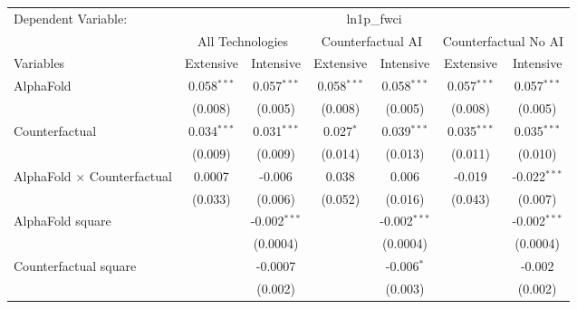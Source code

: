 \begingroup
\centering
\begin{tabular}{lcccccc}
   \tabularnewline \midrule \midrule
   Dependent Variable: & \multicolumn{6}{c}{ln1p\_fwci}\\
 & \multicolumn{2}{c}{All Technologies} & \multicolumn{2}{c}{Counterfactual AI} & \multicolumn{2}{c}{Counterfactual No AI} \\
\cmidrule(lr){1-1}\cmidrule(lr){2-3} \cmidrule(lr){4-5} \cmidrule(lr){6-7}
Variables & \multicolumn{1}{c}{Extensive} & \multicolumn{1}{c}{Intensive} & \multicolumn{1}{c}{Extensive} & \multicolumn{1}{c}{Intensive} & \multicolumn{1}{c}{Extensive} & \multicolumn{1}{c}{Intensive} \\
\cmidrule(lr){1-1}\cmidrule(lr){2-2} \cmidrule(lr){3-3} \cmidrule(lr){4-4} \cmidrule(lr){5-5} \cmidrule(lr){6-6} \cmidrule(lr){7-7}
   AlphaFold                          & 0.058$^{***}$ & 0.057$^{***}$  & 0.058$^{***}$ & 0.058$^{***}$  & 0.057$^{***}$ & 0.057$^{***}$\\   
                                      & (0.008)       & (0.005)        & (0.008)       & (0.005)        & (0.008)       & (0.005)\\   
   Counterfactual                     & 0.034$^{***}$ & 0.031$^{***}$  & 0.027$^{*}$   & 0.039$^{***}$  & 0.035$^{***}$ & 0.035$^{***}$\\   
                                      & (0.009)       & (0.009)        & (0.014)       & (0.013)        & (0.011)       & (0.010)\\   
   AlphaFold $\times$ Counterfactual  & 0.0007        & -0.006         & 0.038         & 0.006          & -0.019        & -0.022$^{***}$\\   
                                      & (0.033)       & (0.006)        & (0.052)       & (0.016)        & (0.043)       & (0.007)\\   
   AlphaFold square                   &               & -0.002$^{***}$ &               & -0.002$^{***}$ &               & -0.002$^{***}$\\   
                                      &               & (0.0004)       &               & (0.0004)       &               & (0.0004)\\   
   Counterfactual square              &               & -0.0007        &               & -0.006$^{*}$   &               & -0.002\\   
                                      &               & (0.002)        &               & (0.003)        &               & (0.002)\\   

\end{tabular}
